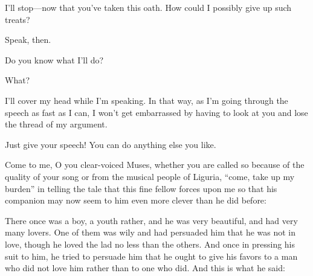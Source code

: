 \saysocrates I'll stop---now that you've taken this oath. How could I
possibly give up such treats?

\sayphaedrus Speak, then.

\saysocrates Do you know what I'll do?

\sayphaedrus What?

\saysocrates I'll cover my head while I'm speaking. In that way, as I'm
going through the speech as fast as I can, I won't get embarrassed by
having to look at you and lose the thread of my argument.

\sayphaedrus Just give your speech! You can do anything else you like.

\saysocrates Come to me, O you clear-voiced Muses, whether you are called
so because of the quality of your song or from the musical people of
Liguria, “come, take up my burden” in telling the tale that this fine fellow forces upon me
so that his companion may now seem to him even more clever than
he did before:


There once was a boy, a youth rather, and he was very beautiful, and had
very many lovers. One of them was wily and had persuaded him that he was
not in love, though he loved the lad no less than the others. And once
in pressing his suit to him, he tried to persuade him that he ought to
give his favors to a man who did not love him rather than to one who
did. And this is what he said:

